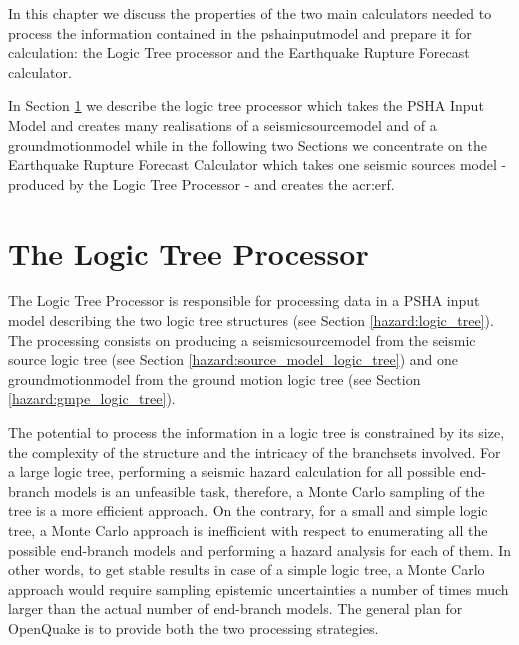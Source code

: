 In this chapter we discuss the properties of the two main calculators 
needed to process the information contained in the \gls{pshainputmodel} 
and prepare it for calculation: the Logic Tree processor and the 
Earthquake Rupture Forecast calculator. 

In Section \ref{hazard:logic_tree_processor} we describe the logic 
tree processor which takes the PSHA Input Model and creates many 
realisations of a \gls{seismicsourcemodel} and of a 
\gls{groundmotionmodel} while in the following two Sections we concentrate 
on the Earthquake Rupture Forecast Calculator which takes one seismic
sources model - produced by the Logic Tree Processor - and creates 
the \gls{acr:erf}.  
%
\section{The Logic Tree Processor}
\label{hazard:logic_tree_processor}
%
The Logic Tree Processor is responsible for processing data in a 
PSHA input model describing the two logic tree structures
(see Section \ref{hazard:logic_tree}). 
%
The processing consists on producing a \gls{seismicsourcemodel} from the 
seismic source logic tree (see Section \ref{hazard:source_model_logic_tree}) 
and one \gls{groundmotionmodel} from the ground motion logic tree 
(see Section \ref{hazard:gmpe_logic_tree}). 
%

The potential to process the information in a logic tree is constrained 
by its size, the complexity of the structure and the intricacy of the 
\glspl{branchset} involved.
%
For a large logic tree, performing a seismic hazard calculation for 
all possible end-branch models is an unfeasible task, therefore, 
a Monte Carlo sampling of the tree is a more efficient approach. 
%
On the contrary, for a small and simple logic tree, a Monte Carlo 
approach is inefficient with respect to enumerating all the possible 
end-branch models and performing a hazard analysis for each of them. 
%
In other words, to get stable results in case of a simple logic tree, 
a Monte Carlo approach would require sampling epistemic uncertainties 
a number of times much larger than the actual number of end-branch models.
%
The general plan for OpenQuake is to provide both the two processing 
strategies. 

